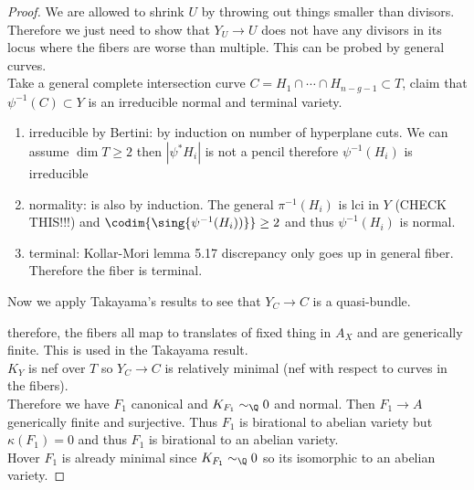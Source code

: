 \documentclass[12pt]{article}
\begin{document}
\begin{proof}
We are allowed to shrink $U$ by throwing out things smaller than divisors. Therefore we just need to show that $Y_U \to U$ does not have any divisors in its locus where the fibers are worse than multiple. This can be probed by general curves.
\bigskip\\
Take a general complete intersection curve $C = H_1 \cap \cdots \cap H_{n-g-1} \subset T$, claim that $\psi^{-1}(C) \subset Y$ is an irreducible normal and terminal variety. 
\begin{enumerate}
\item irreducible by Bertini: by induction on number of hyperplane cuts. We can assume $\dim{T} \ge 2$ then $| \psi^* H_i |$ is not a pencil therefore $\psi^{-1}(H_i)$ is irreducible 

\item normality: is also by induction. The general $\pi^{-1}(H_i)$ is lci in $Y$ (CHECK THIS!!!) and $\codim{\sing{\psi^{-1}(H_i))}} \ge 2$ and thus $\psi^{-1}(H_i)$ is normal.

\item terminal: Kollar-Mori lemma 5.17 discrepancy only goes up in general fiber. Therefore the fiber is terminal.
\end{enumerate}
Now we apply Takayama's results to see that $Y_C \to C$ is a quasi-bundle. 
\begin{center}
\end{center}
therefore, the fibers all map to translates of fixed thing in $A_X$ and are generically finite. This is used in the Takayama result. 
\bigskip\\
$K_Y$ is nef over $T$ so $Y_C \to C$ is relatively minimal (nef with respect to curves in the fibers). 
\bigskip\\
Therefore we have $F_1$ canonical and $K_{F_1} \sim_{\Q} 0$ and normal. Then $F_1 \to A$ generically finite and surjective. Thus $F_1$ is birational to abelian variety but $\kappa(F_1) = 0$ and thus $F_1$ is birational to an abelian variety.
\bigskip\\
Hover $F_1$ is already minimal since $K_{F_1} \sim_{\Q} 0$ so its isomorphic to an abelian variety.  
\end{proof}
\end{document}
